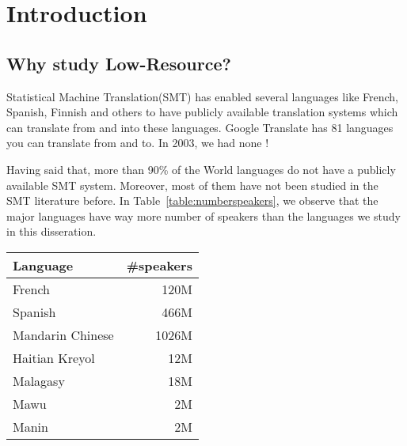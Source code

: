 
%
%

\chapter{Introduction}
\label{sec:introduction}

\section{Why study Low-Resource?}
\label{sec:low_resource}
Statistical Machine Translation(SMT) has enabled several languages like French, Spanish, Finnish and others to have publicly available translation systems which can translate from and into these languages. Google Translate has 81 languages you can translate from and to. In 2003, we had none ! 


Having said that, more than 90\% of the World languages do not have a publicly available SMT system. Moreover, most of them have not been studied in the SMT literature before. In Table~\ref{table:numberspeakers}, we observe that the major languages have way more number of speakers than the languages we study in this disseration. 
\begin{table*}
	\begin{tabular}{lr}
	\toprule
	Language & \#speakers \\
	\toprule
	French & 120M \\
	Spanish & 466M \\
	Mandarin Chinese & 1026M \\
	\midrule
	Haitian Kreyol & 12M \\
	Malagasy & 18M \\
	Mawu & 2M \\
	Manin & 2M \\
	\bottomrule
	\end{tabular}
	\caption{Number of speakers for Major and low-resource languages}
	\label{table:numberspeakers}
\end{table*}


